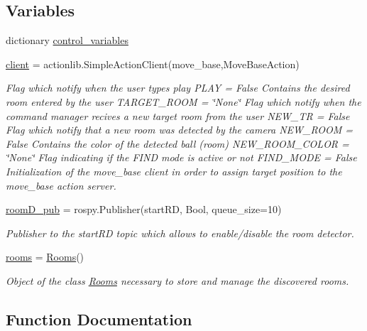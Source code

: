 \subsection*{Variables}
\begin{DoxyCompactItemize}
\item 
dictionary \hyperlink{namespacecommandManager_a3c82d03952562f9cf96be2e80ae059a3}{control\+\_\+variables}
\item 
\hyperlink{namespacecommandManager_ad81f5cdd9bf18b67989c77a2329b9e28}{client} = actionlib.\+Simple\+Action\+Client(\textquotesingle{}move\+\_\+base\textquotesingle{},Move\+Base\+Action)
\begin{DoxyCompactList}\small\item\em Flag which notify when the user types \textquotesingle{}play\textquotesingle{} P\+L\+AY = False Contains the desired room entered by the user T\+A\+R\+G\+E\+T\+\_\+\+R\+O\+OM = \char`\"{}\+None\char`\"{} Flag which notify when the command manager recives a new target room from the user N\+E\+W\+\_\+\+TR = False Flag which notify that a new room was detected by the camera N\+E\+W\+\_\+\+R\+O\+OM = False Contains the color of the detected ball (room) N\+E\+W\+\_\+\+R\+O\+O\+M\+\_\+\+C\+O\+L\+OR = \char`\"{}\+None\char`\"{} Flag indicating if the F\+I\+ND mode is active or not F\+I\+N\+D\+\_\+\+M\+O\+DE = False Initialization of the move\+\_\+base client in order to assign target position to the move\+\_\+base action server. \end{DoxyCompactList}\item 
\hyperlink{namespacecommandManager_a5cf709943d61e92e0ce4c1652403ae8d}{room\+D\+\_\+pub} = rospy.\+Publisher(\textquotesingle{}start\+RD\textquotesingle{}, Bool, queue\+\_\+size=10)
\begin{DoxyCompactList}\small\item\em Publisher to the start\+RD topic which allows to enable/disable the room detector. \end{DoxyCompactList}\item 
\hyperlink{namespacecommandManager_a868809e1f6a79e7b7ce5ea405e978d48}{rooms} = \hyperlink{classRooms_1_1Rooms}{Rooms}()
\begin{DoxyCompactList}\small\item\em Object of the class \hyperlink{namespaceRooms}{Rooms} necessary to store and manage the discovered rooms. \end{DoxyCompactList}\end{DoxyCompactItemize}


\subsection{Function Documentation}
